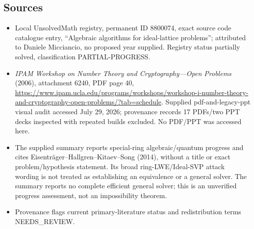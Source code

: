 \documentclass[11pt]{article}
\begin{document}
\subsection{Sources}
\begin{itemize}
\item Local UnsolvedMath registry, permanent ID 8800074, exact source code catalogue entry, ``Algebraic algorithms for ideal-lattice problems''; attributed to Daniele Micciancio, no proposed year supplied. Registry status partially solved, classification PARTIAL-PROGRESS.
\item \emph{IPAM Workshop on Number Theory and Cryptography---Open Problems} (2006), attachment 6240, PDF page 40, \url{https://www.ipam.ucla.edu/programs/workshops/workshop-i-number-theory-and-cryptography-open-problems/?tab=schedule}. Supplied pdf-and-legacy-ppt visual audit accessed July 29, 2026; provenance records 17 PDFs/two PPT decks inspected with repeated builds excluded. No PDF/PPT was accessed here.
\item The supplied summary reports special-ring algebraic/quantum progress and cites Eisentr\"ager--Hallgren--Kitaev--Song (2014), without a title or exact problem/hypothesis statement. Its broad ring-LWE/Ideal-SVP attack wording is not treated as establishing an equivalence or a general solver. The summary reports no complete efficient general solver; this is an unverified progress assessment, not an impossibility theorem.
\item Provenance flags current primary-literature status and redistribution terms NEEDS\_REVIEW.
\end{itemize}
\end{document}
